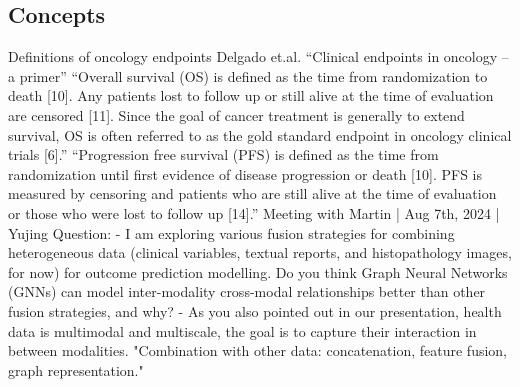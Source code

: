 \documentclass{article}%
\begin{document}
\subsection{Concepts }%
\label{subsec:Concepts}%

%
Definitions of oncology endpoints Delgado et.al. “Clinical endpoints in oncology – a primer”%
\newline%
\newline%
%
%
\newline%
\newline%
%
“Overall survival (OS) is defined as the time from randomization to death {[}10{]}. Any patients lost to follow up or still alive at the time of evaluation are censored {[}11{]}. Since the goal of cancer treatment is generally to extend survival, OS is often referred to as the gold standard endpoint in oncology clinical trials {[}6{]}.”%
\newline%
\newline%
%
“Progression free survival (PFS) is defined as the time from randomization until first evidence of disease progression or death {[}10{]}. PFS is measured by censoring and patients who are still alive at the time of evaluation or those who were lost to follow up {[}14{]}.”%
\newline%
\newline%
%
%
\newline%
\newline%
%
%
\newline%
\newline%
%
Meeting with Martin | Aug 7th, 2024 | Yujing %
\newline%
\newline%
%
%
\newline%
\newline%
%
Question:%
\newline%
\newline%
%
%
\newline%
\newline%
%
{-} I am exploring various fusion strategies for combining heterogeneous data (clinical variables, textual reports, and histopathology images, for now) for outcome prediction modelling. Do you think Graph Neural Networks (GNNs) can model inter{-}modality cross{-}modal relationships better than other fusion strategies, and why? %
\newline%
\newline%
%
%
\newline%
\newline%
%
{-} As you also pointed out in our presentation, health data is multimodal and multiscale, the goal is to capture their interaction in between modalities. "Combination with other data: concatenation, feature fusion, graph representation."%
\end{document}
